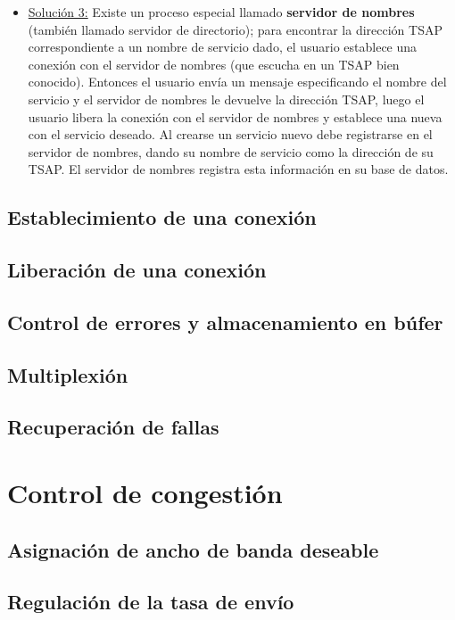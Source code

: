 \documentclass[10pt,a4paper]{report}
\begin{document}
\begin{itemize}
	\item  \underline{Solución 3:} Existe un proceso especial llamado \textbf{servidor 
	de nombres} (también llamado servidor de directorio); para encontrar la dirección 
	TSAP correspondiente a un nombre de servicio dado, el usuario establece una 
	conexión con el servidor de nombres (que escucha en un TSAP bien conocido). 
	Entonces el 	usuario envía un mensaje especificando el nombre del servicio y el 
	servidor de nombres le devuelve la dirección TSAP, luego el usuario libera la 
	conexión con el servidor de nombres y establece una nueva con el servicio deseado. 
	Al crearse un servicio nuevo debe registrarse en el servidor de nombres, dando su 
	nombre de servicio como la dirección de su TSAP. El servidor de nombres registra 
	esta 	información en su base de datos.
\end{itemize} 

\subsection{Establecimiento de una conexión}

\subsection{Liberación de una conexión}

\subsection{Control de errores y almacenamiento en búfer}
\subsection{Multiplexión}
\subsection{Recuperación de fallas}
\section{Control de congestión}
\subsection{Asignación de ancho de banda deseable }
\subsection{Regulación de la tasa de envío}
\end{document}
